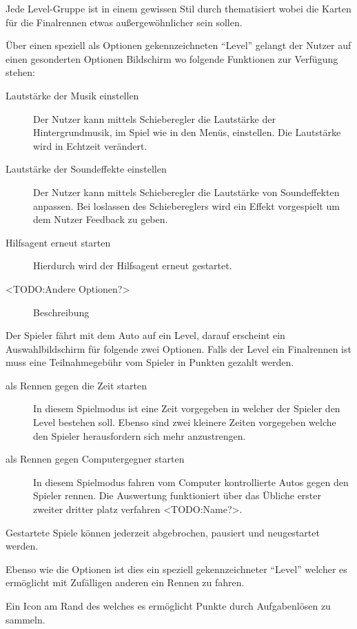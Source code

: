 \begin{description}
{			Jede Level-Gruppe ist in einem gewissen Stil durch thematisiert wobei die Karten für die Finalrennen etwas außergewöhnlicher sein sollen.
		}
		\item[Optionen ändern]{ Über einen speziell als Optionen gekennzeichneten \enquote{Level} gelangt der Nutzer auf einen gesonderten Optionen Bildschirm wo folgende Funktionen zur Verfügung stehen:
			\begin{description}
				\item[Lautstärke der Musik einstellen]{ Der Nutzer kann mittels Schieberegler die Lautstärke der Hintergrundmusik, im Spiel wie in den Menüs, einstellen. Die Lautstärke wird in Echtzeit verändert. }
				\item[Lautstärke der Soundeffekte einstellen]{ Der Nutzer kann mittels Schieberegler die Lautstärke von Soundeffekten anpassen. Bei loslassen des Schiebereglers wird ein Effekt vorgespielt um dem Nutzer Feedback zu geben. }
				\item[Hilfsagent erneut starten]{ Hierdurch wird der Hilfsagent erneut gestartet. }
				\item[<TODO:Andere Optionen?>]{ Beschreibung }
			\end{description}
		}
		\item[Level wählen]{ Der Spieler fährt mit dem Auto auf ein Level, darauf erscheint ein Auswahlbildschirm für folgende zwei Optionen. Falls der Level ein Finalrennen ist muss eine Teilnahmegebühr vom Spieler in Punkten gezahlt werden.
			\begin{description}
				\item[als Rennen gegen die Zeit starten]{ In diesem Spielmodus ist eine Zeit vorgegeben in welcher der Spieler den Level bestehen soll. Ebenso sind zwei kleinere Zeiten vorgegeben welche den Spieler herausfordern sich mehr anzustrengen. }
				\item[als Rennen gegen Computergegner starten]{ In diesem Spielmodus fahren vom Computer kontrollierte Autos gegen den Spieler rennen. Die Auswertung funktioniert über das Übliche erster zweiter dritter platz verfahren <TODO:Name?>. }
			\end{description}
			Gestartete Spiele können jederzeit abgebrochen, pausiert und neugestartet werden.
		}
		\item[Onlinespiel starten]{ Ebenso wie die Optionen ist dies ein speziell gekennzeichneter \enquote{Level} welcher es ermöglicht mit Zufälligen anderen ein Rennen zu fahren. }
		\item[Extra Aufgaben Lösen]{ Ein Icon am Rand des welches es ermöglicht Punkte durch Aufgabenlösen zu sammeln. }

\end{description}
